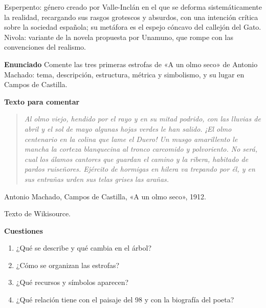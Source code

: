 \documentclass{book}
\begin{document}
\begin{tcolorbox}[title={Definición}, studiumdef, breakable]

Esperpento: género creado por Valle-Inclán en el que se deforma sistemáticamente la realidad, recargando sus rasgos grotescos y absurdos, con una intención crítica sobre la sociedad española; su metáfora es el espejo cóncavo del callejón del Gato. Nivola: variante de la novela propuesta por Unamuno, que rompe con las convenciones del realismo.

\end{tcolorbox}

\begin{tcolorbox}[title={Ejercicio resuelto}, studiumworked, breakable]

\noindent\textbf{Enunciado}
Comente las tres primeras estrofas de «A un olmo seco» de Antonio Machado: tema, descripción, estructura, métrica y simbolismo, y su lugar en Campos de Castilla.


\noindent\textbf{Texto para comentar}

\begin{quote}
\itshape Al olmo viejo, hendido por el rayo y en su mitad podrido, con las lluvias de abril y el sol de mayo algunas hojas verdes le han salido. ¡El olmo centenario en la colina que lame el Duero! Un musgo amarillento le mancha la corteza blanquecina al tronco carcomido y polvoriento. No será, cual los álamos cantores que guardan el camino y la ribera, habitado de pardos ruiseñores. Ejército de hormigas en hilera va trepando por él, y en sus entrañas urden sus telas grises las arañas.
\end{quote}
{\noindent\footnotesize Antonio Machado, Campos de Castilla, «A un olmo seco», 1912.\par}
{\noindent\footnotesize Texto de Wikisource.\par}

\noindent\textbf{Cuestiones}
\begin{enumerate}
\item ¿Qué se describe y qué cambia en el árbol?
\item ¿Cómo se organizan las estrofas?
\item ¿Qué recursos y símbolos aparecen?
\item ¿Qué relación tiene con el paisaje del 98 y con la biografía del poeta?
\end{enumerate}


\end{tcolorbox}
\end{document}
